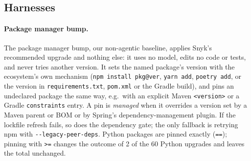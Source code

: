 \documentclass[11pt]{article}
\theoremstyle{definition}
\newcommand{\pmbump}{package manager bump}
\begin{document}
\subsection{Harnesses}
\label{sec:agents}

\paragraph{Package manager bump.} The \pmbump{}, our non-agentic baseline, applies Snyk's recommended upgrade and nothing else: it uses no model, edits no code or tests, and never tries another version. It sets the named package's version with the ecosystem's own mechanism (\texttt{npm install pkg@ver}, \texttt{yarn add}, \texttt{poetry add}, or the version in \texttt{requirements.txt}, \texttt{pom.xml} or the Gradle build), and pins an undeclared package the same way, e.g.\ with an explicit Maven \texttt{<version>} or a Gradle \texttt{constraints} entry. A pin is \emph{managed} when it overrides a version set by a Maven parent or BOM or by Spring's dependency-management plugin. If the lockfile refresh fails, so does the dependency gate; the only fallback is retrying npm with \texttt{-{}-legacy-peer-deps}. Python packages are pinned exactly (\texttt{==}); pinning with \texttt{>=} changes the outcome of 2 of the 60 Python upgrades and leaves the total unchanged.
\end{document}
